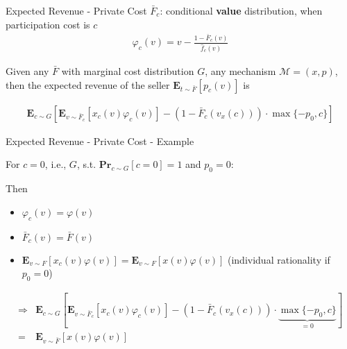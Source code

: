 \documentclass{beamer}
\begin{document}
\begin{frame}{Expected Revenue - Private Cost}
  $\bar{F}_c$: conditional \textbf{value} distribution, when participation cost is $c$
  \begin{align*}
    \varphi_c(v) = v - \frac{1- \bar{F}_c(v)}{\hat{f}_c(v)}
  \end{align*}

  \begin{theorem}
    Given any $\bar{F}$ with marginal cost distribution $G$, any mechanism $\mathcal{M}=(x,p)$, then the expected revenue of the seller $\mathbf{E}_{t \sim \bar{F}}\left[p_c(v)\right] $ is

    \begin{align*}
      \mathbf{E}_{c \sim G}\left[\mathbf{E}_{v\sim\bar{F}_c}\left[x_c(v)\varphi_c(v)\right] - (1-\bar{F}_c(v_x(c))) \cdot \max\{-p_0,c\}\right]
    \end{align*}
  \end{theorem}
\end{frame}

\begin{frame}{Expected Revenue - Private Cost - Example}
  \begin{example}
    For $c = 0$, i.e., $G$, s.t. $\mathbf{Pr}_{c \sim G}[c = 0] = 1$ and $p_0 = 0$:
  \end{example}

  Then
  \begin{itemize}
    \item $\varphi_c(v) = \varphi(v)$
    \item $\bar{F}_c(v) = \bar{F}(v)$
    \item $\mathbf{E}_{v \sim F}\left[x_c(v) \varphi(v)\right] = \mathbf{E}_{v \sim F}\left[x(v) \varphi(v)\right]$
          (individual rationality if $p_0 = 0$)
  \end{itemize}

  \begin{align*}
    \Rightarrow & \mathbf{E}_{c \sim G}\left[\mathbf{E}_{v\sim\bar{F}_c}\left[x_c(v)\varphi_c(v)\right] - (1-\bar{F}_c(v_x(c))) \cdot \underbrace{\max\{-p_0,c\}}_{=0}\right] \\
    =           & \mathbf{E}_{v \sim \bar{F}}\left[x(v) \varphi(v)\right]
  \end{align*}
\end{frame}
\end{document}
